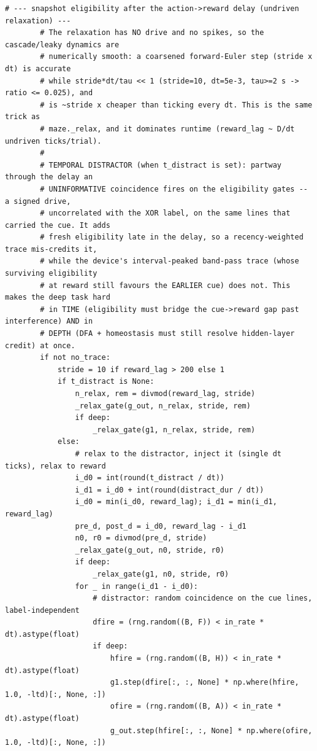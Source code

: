 \begin{lstlisting}[caption={mrl\_trace/deep.py},label={lst:siox-src-deep}]
        # --- snapshot eligibility after the action->reward delay (undriven relaxation) ---
        # The relaxation has NO drive and no spikes, so the cascade/leaky dynamics are
        # numerically smooth: a coarsened forward-Euler step (stride x dt) is accurate
        # while stride*dt/tau << 1 (stride=10, dt=5e-3, tau>=2 s -> ratio <= 0.025), and
        # is ~stride x cheaper than ticking every dt. This is the same trick as
        # maze._relax, and it dominates runtime (reward_lag ~ D/dt undriven ticks/trial).
        #
        # TEMPORAL DISTRACTOR (when t_distract is set): partway through the delay an
        # UNINFORMATIVE coincidence fires on the eligibility gates -- a signed drive,
        # uncorrelated with the XOR label, on the same lines that carried the cue. It adds
        # fresh eligibility late in the delay, so a recency-weighted trace mis-credits it,
        # while the device's interval-peaked band-pass trace (whose surviving eligibility
        # at reward still favours the EARLIER cue) does not. This makes the deep task hard
        # in TIME (eligibility must bridge the cue->reward gap past interference) AND in
        # DEPTH (DFA + homeostasis must still resolve hidden-layer credit) at once.
        if not no_trace:
            stride = 10 if reward_lag > 200 else 1
            if t_distract is None:
                n_relax, rem = divmod(reward_lag, stride)
                _relax_gate(g_out, n_relax, stride, rem)
                if deep:
                    _relax_gate(g1, n_relax, stride, rem)
            else:
                # relax to the distractor, inject it (single dt ticks), relax to reward
                i_d0 = int(round(t_distract / dt))
                i_d1 = i_d0 + int(round(distract_dur / dt))
                i_d0 = min(i_d0, reward_lag); i_d1 = min(i_d1, reward_lag)
                pre_d, post_d = i_d0, reward_lag - i_d1
                n0, r0 = divmod(pre_d, stride)
                _relax_gate(g_out, n0, stride, r0)
                if deep:
                    _relax_gate(g1, n0, stride, r0)
                for _ in range(i_d1 - i_d0):
                    # distractor: random coincidence on the cue lines, label-independent
                    dfire = (rng.random((B, F)) < in_rate * dt).astype(float)
                    if deep:
                        hfire = (rng.random((B, H)) < in_rate * dt).astype(float)
                        g1.step(dfire[:, :, None] * np.where(hfire, 1.0, -ltd)[:, None, :])
                        ofire = (rng.random((B, A)) < in_rate * dt).astype(float)
                        g_out.step(hfire[:, :, None] * np.where(ofire, 1.0, -ltd)[:, None, :])

\end{lstlisting}
